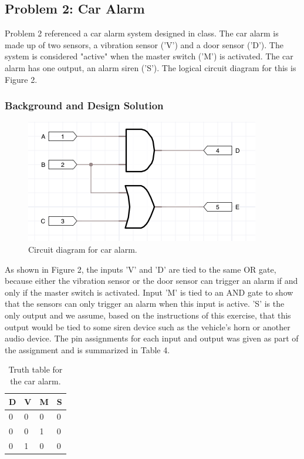 \documentclass[11pt]{article}
\begin{document}
\subsection{Problem 2: Car Alarm}

Problem 2 referenced a car alarm system designed in class. The car alarm is made up of two sensors, a vibration sensor ('V') and a door sensor ('D'). The system is considered "active" when the master switch ('M') is activated. The car alarm has one output, an alarm siren ('S'). The logical circuit diagram for this is Figure 2.

\subsubsection{Background and Design Solution}

\begin{figure}[h]
	\includegraphics[width=\textwidth]{report_images/img1}
	\caption{\label{fig:figure-name}Circuit diagram for car alarm.}
\end{figure}

As shown in Figure 2, the inputs 'V' and 'D' are tied to the same OR gate, because either the vibration sensor or the door sensor can trigger an alarm if and only if the master switch is activated. Input 'M' is tied to an AND gate to show that the sensors can only trigger an alarm when this input is active. 'S' is the only output and we assume, based on the instructions of this exercise, that this output would be tied to some siren device such as the vehicle's horn or another audio device. The pin assignments for each input and output was given as part of the assignment and is summarized in Table 4.

\begin{table}[h]
\begin{center}
	\begin{tabular}{| l | l | l | l |}
	\hline
	D & V & M & S \\ \hline
	0 & 0 & 0 & 0 \\ \hline
	0 & 0 & 1 & 0 \\ \hline
	0 & 1 & 0 & 0 \\ \hline	
	\end{tabular}
	\caption{\label{tab:table-name}Truth table for the car alarm.}
\end{center}
\end{table}
\end{document}
